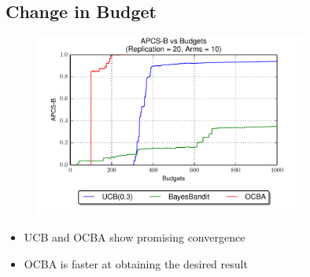 \documentclass[compress]{beamer}
\begin{document}
\subsection{Change in Budget}

\begin{frame}
\begin{figure}[p]
    \centering
    \includegraphics[page=1,width=0.8\textwidth]{11series_pcs.pdf}
\end{figure}
\begin{itemize}
\item UCB and OCBA show promising convergence\\
\item OCBA is faster at obtaining the desired result
\end{itemize}
\end{frame}
\end{document}
